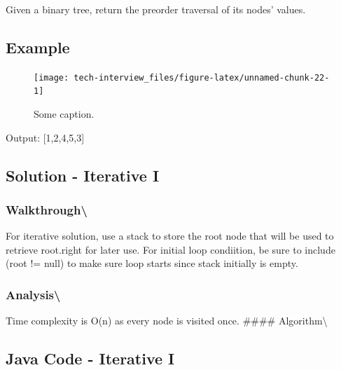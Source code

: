 \documentclass[]{book}
\begin{document}
Given a binary tree, return the preorder traversal of its nodes' values.

\hypertarget{example-59}{%
\subsection{Example}\label{example-59}}

\begin{figure}
\texttt{[image: tech-interview\_files/figure-latex/unnamed-chunk-22-1]} \caption{Some caption.}\label{fig:unnamed-chunk-22}
\end{figure}

Output: {[}1,2,4,5,3{]}

\hypertarget{solution---iterative-i}{%
\subsection{Solution - Iterative I}\label{solution---iterative-i}}

\hypertarget{walkthrough-66}{%
\subsubsection{Walkthrough\textbackslash{}}\label{walkthrough-66}}

For iterative solution, use a stack to store the root node that will be used to retrieve root.right for later use. For
initial loop condiition, be sure to include (root != null) to make sure loop starts since stack initially is empty.

\hypertarget{analysis-73}{%
\subsubsection{Analysis\textbackslash{}}\label{analysis-73}}

Time complexity is O(n) as every node is visited once.
\#\#\#\# Algorithm\textbackslash{}

\hypertarget{java-code---iterative-i}{%
\subsection{Java Code - Iterative I}\label{java-code---iterative-i}}
\end{document}
